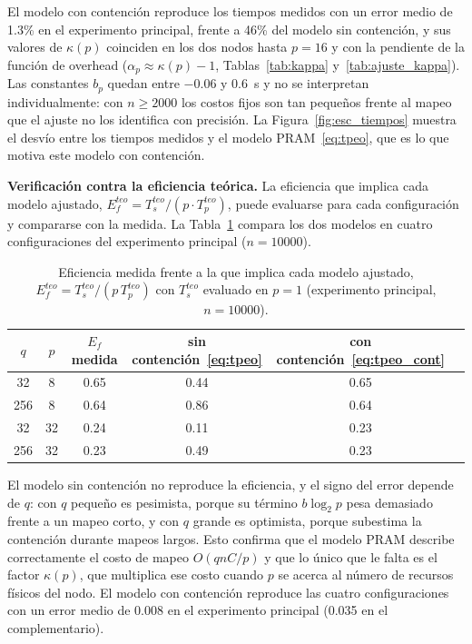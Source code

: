 \documentclass[11pt, a4paper]{article}
\begin{document}
El modelo con contención reproduce los tiempos medidos con un error medio de 1.3\% en el experimento principal, frente a 46\% del modelo sin contención, y sus valores de $\kappa(p)$ coinciden en los dos nodos hasta $p = 16$ y con la pendiente de la función de overhead ($\alpha_p \approx \kappa(p)-1$, Tablas~\ref{tab:kappa} y~\ref{tab:ajuste_kappa}). Las constantes $b_p$ quedan entre $-0.06$ y $0.6$~s y no se interpretan individualmente: con $n \ge 2000$ los costos fijos son tan pequeños frente al mapeo que el ajuste no los identifica con precisión. La Figura~\ref{fig:esc_tiempos} muestra el desvío entre los tiempos medidos y el modelo PRAM~\eqref{eq:tpeo}, que es lo que motiva este modelo con contención.

\textbf{Verificación contra la eficiencia teórica.} La eficiencia que implica cada modelo ajustado, $E_f^{teo} = T_s^{teo}/(p \cdot T_p^{teo})$, puede evaluarse para cada configuración y compararse con la medida. La Tabla~\ref{tab:verif_ef} compara los dos modelos en cuatro configuraciones del experimento principal ($n = 10000$).

\begin{table}[H]
\centering
\small
\caption{Eficiencia medida frente a la que implica cada modelo ajustado, $E_f^{teo} = T_s^{teo}/(p\,T_p^{teo})$ con $T_s^{teo}$ evaluado en $p = 1$ (experimento principal, $n = 10000$).}
\label{tab:verif_ef}
\begin{tabular}{cccccc}
\toprule
$q$ & $p$ & $E_f$ medida & sin contención~\eqref{eq:tpeo} & con contención~\eqref{eq:tpeo_cont} \\
\midrule
32  & 8  & 0.65 & 0.44 & 0.65 \\
256 & 8  & 0.64 & 0.86 & 0.64 \\
32  & 32 & 0.24 & 0.11 & 0.23 \\
256 & 32 & 0.23 & 0.49 & 0.23 \\
\bottomrule
\end{tabular}
\end{table}

El modelo sin contención no reproduce la eficiencia, y el signo del error depende de $q$: con $q$ pequeño es pesimista, porque su término $b\log_2 p$ pesa demasiado frente a un mapeo corto, y con $q$ grande es optimista, porque subestima la contención durante mapeos largos. Esto confirma que el modelo PRAM describe correctamente el costo de mapeo $O(qnC/p)$ y que lo único que le falta es el factor $\kappa(p)$, que multiplica ese costo cuando $p$ se acerca al número de recursos físicos del nodo. El modelo con contención reproduce las cuatro configuraciones con un error medio de 0.008 en el experimento principal (0.035 en el complementario).
\end{document}
